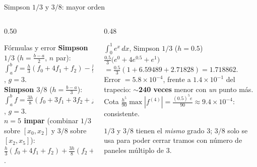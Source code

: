 \documentclass[aspectratio=169,10pt]{beamer}
\begin{document}
\begin{frame}{Simpson $1/3$ y $3/8$: mayor orden}
\begin{columns}[T]
\begin{column}{0.50\textwidth}
\begin{cardidea}{Fórmulas y error}{\faSuperscript}
{\footnotesize \textbf{Simpson $1/3$} ($h=\tfrac{b-a}{2}$, $n$ par):\\[0.2mm]
$\int_a^b f=\tfrac{h}{3}(f_0+4f_1+f_2)-\tfrac{h^5}{90}f^{(4)}(\xi)$, $g{=}3$.\\[0.8mm]
\textbf{Simpson $3/8$} ($h=\tfrac{b-a}{3}$):\\[0.2mm]
$\int_a^b f=\tfrac{3h}{8}(f_0+3f_1+3f_2+f_3)-\tfrac{3h^5}{80}f^{(4)}(\xi)$, $g{=}3$.\\[1.0mm]
\textbf{$n=5$ impar} (combinar $1/3$ sobre $[x_0,x_2]$ y $3/8$ sobre $[x_2,x_5]$):\\[0.2mm]
$\tfrac{h}{3}(f_0{+}4f_1{+}f_2)+\tfrac{3h}{8}(f_2{+}3f_3{+}3f_4{+}f_5)$.}
\end{cardidea}
\end{column}
\begin{column}{0.48\textwidth}
\begin{cardgear}{$\int_0^1 e^x\,dx$, Simpson $1/3$ ($h=0.5$)}{\faCalculator}
{\footnotesize $\tfrac{0.5}{3}\big(e^0+4e^{0.5}+e^1\big)$\\[0.4mm]
$=\tfrac{0.5}{3}(1+6.59489+2.71828)=1.718862$.\\[0.8mm]
Error $=5.8{\times}10^{-4}$, frente a $1.4{\times}10^{-1}$ del trapecio: \textbf{$\sim$240 veces} menor con \emph{un} punto más.\\[0.6mm]
Cota $\tfrac{h^5}{90}\max|f^{(4)}|=\tfrac{(0.5)^5 e}{90}\approx9.4{\times}10^{-4}$: consistente.}
\end{cardgear}
\vspace{1mm}
\begin{cardnota}[\faInfoCircle]
{\footnotesize $1/3$ y $3/8$ tienen el \emph{mismo} grado $3$; $3/8$ solo se usa para poder cerrar tramos con número de paneles múltiplo de $3$.}
\end{cardnota}
\end{column}
\end{columns}
\end{frame}
\end{document}
